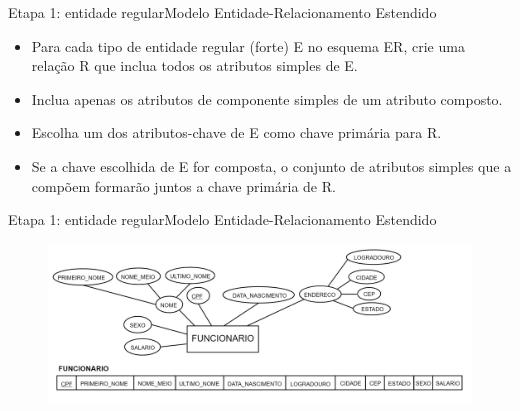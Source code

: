 \documentclass[t]{beamer}
\begin{document}

\begin{ftst}{Etapa 1: entidade regular}{Modelo Entidade-Relacionamento Estendido}
\begin{itemize}
    \item Para cada tipo de entidade regular (forte) E no esquema ER, crie uma relação R que inclua todos os atributos simples de E.
    \item Inclua apenas os atributos de componente simples de um atributo composto.
    \item Escolha um dos atributos-chave de E como chave primária para R.
    \item Se a chave escolhida de E for composta, o conjunto de atributos simples que a compõem formarão juntos a chave primária de R.
    
\end{itemize}
\end{ftst}


\begin{ftst}{Etapa 1: entidade regular}{Modelo Entidade-Relacionamento Estendido}
\vone
\begin{figure}
    \centering
    \includegraphics[scale=0.15]{Figuras/03_03.png}
\end{figure}
\end{ftst}

\end{document}
